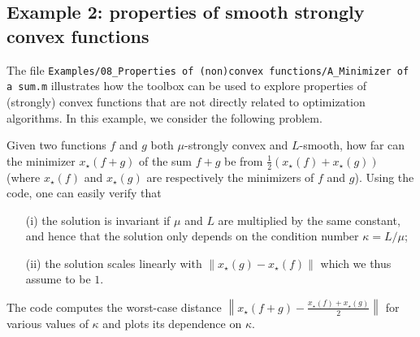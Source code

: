 \documentclass[11pt,a4paper]{article}
\newcommand{\norm}[1]{{\left\lVert#1\right\rVert}}
\begin{document}
					\subsection{Example 2: properties of smooth strongly convex functions}
					The file \verb?Examples/08_Properties of (non)convex functions/A_Minimizer of a sum.m? illustrates how the toolbox can be used to explore properties of (strongly) convex functions that are not directly related to optimization algorithms. In this example, we consider the following problem.
					
					Given two functions $f$ and $g$ both $\mu$-strongly convex and $L$-smooth, how far can the minimizer $x_\star(f+g)$ of the sum $f+g$ be from $\tfrac12 (x_\star(f)+x_\star(g))$ (where $x_\star(f)$ and $x_\star(g)$ are respectively the minimizers of $f$ and $g$). Using the code, one can easily verify that
					\begin{itemize}
						\item[(i)] the solution is invariant if $\mu$ and $L$ are multiplied by the same constant, and hence that the solution only depends on the condition number $\kappa = L/\mu$;
						\item[(ii)] the solution scales linearly with $\norm{x_\star(g)-x_\star(f)}$ which we thus assume to be $1$.
					\end{itemize}
					The code computes the worst-case distance $\norm{x_\star(f+g)-\tfrac{x_\star(f)+x_\star(g)}{2}}$ for various values of $\kappa$ and plots its dependence on $\kappa$.
\end{document}
